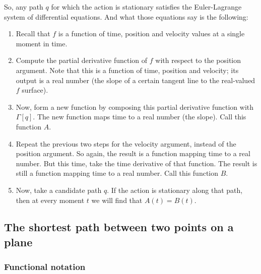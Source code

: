 So, any path $q$ for which the action is stationary satisfies the Euler-Lagrange system of
differential equations. And what those equations say is the following:
\begin{enumerate}
\item Recall that $f$ is a function of time, position and velocity values at a single moment in time.
\item Compute the partial derivative function of $f$ with respect to the position argument. Note
  that this is a function of time, position and velocity; its output is a real number (the slope
  of a certain tangent line to the real-valued $f$ surface).
\item Now, form a new function by composing this partial derivative function with $\Gamma[q]$. The
  new function maps time to a real number (the slope). Call this function $A$.
\item Repeat the previous two steps for the velocity argument, instead of the position
  argument. So again, the result is a function mapping time to a real number. But this time, take
  the time derivative of that function. The result is still a function mapping time to a real
  number. Call this function $B$.
\item Now, take a candidate path $q$. If the action is stationary along that path, then at every
  moment $t$ we will find that $A(t) = B(t)$.
\end{enumerate}


\newpage
\subsection{The shortest path between two points on a plane}

\subsubsection{Functional notation}

